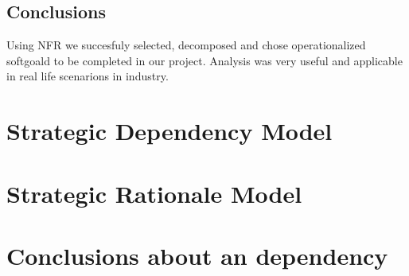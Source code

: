 \documentclass{VUMIFPSkursinis}
\begin{document}
\subsection{Conclusions}
 Using NFR we succesfuly selected, decomposed and chose operationalized softgoald to be completed in our project.
Analysis was very useful and applicable in real life scenarions in industry.
\section{Strategic Dependency Model}
\section{Strategic Rationale Model}
\section{Conclusions about an dependency}
	
\end{document}

